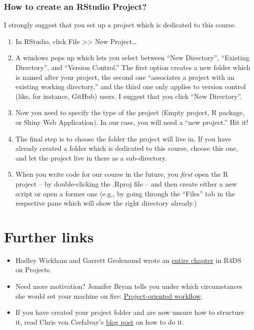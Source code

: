 \documentclass[
]{book}
\providecommand{\tightlist}{%
  \setlength{\itemsep}{0pt}\setlength{\parskip}{0pt}}
\begin{document}
\hypertarget{how-to-create-an-rstudio-project}{%
\subsubsection{How to create an RStudio Project?}\label{how-to-create-an-rstudio-project}}

I strongly suggest that you set up a project which is dedicated to this course.

\begin{enumerate}
\def\labelenumi{\arabic{enumi}.}
\tightlist
\item
  In RStudio, click File \textgreater\textgreater{} New Project\ldots{}
\item
  A windows pops up which lets you select between ``New Directory'', ``Existing Directory'', and ``Version Control.'' The first option creates a new folder which is named after your project, the second one ``associates a project with an existing working directory,'' and the third one only applies to version control (like, for instance, GitHub) users. I suggest that you click ``New Directory''.
\item
  Now you need to specify the type of the project (Empty project, R package, or Shiny Web Application). In our case, you will need a ``new project.'' Hit it!\\
\item
  The final step is to choose the folder the project will live in. If you have already created a folder which is dedicated to this course, choose this one, and let the project live in there as a sub-directory.
\item
  When you write code for our course in the future, you \emph{first} open the R project -- by double-clicking the .Rproj file -- and then create either a new script or open a former one (e.g., by going through the ``Files'' tab in the respective pane which will show the right directory already.)
\end{enumerate}

\hypertarget{further-links}{%
\section{Further links}\label{further-links}}

\begin{itemize}
\tightlist
\item
  Hadley Wickham and Garrett Grolemund wrote an \href{https://r4ds.had.co.nz/workflow-projects.html\#rstudio-projects}{entire chapter} in R4DS on Projects.\\
\item
  Need more motivation? Jennifer Bryan tells you under which circumstances she would set your machine on fire: \href{https://www.tidyverse.org/blog/2017/12/workflow-vs-script/}{Project-oriented workflow}.
\item
  If you have created your project folder and are now unsure how to structure it, read Chris von Csefalvay's \href{https://chrisvoncsefalvay.com/2018/08/09/structuring-r-projects/}{blog post} on how to do it.
\end{itemize}
\end{document}
